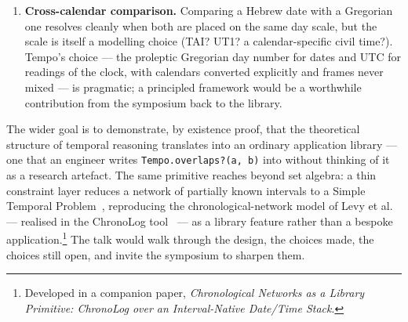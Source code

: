 \begin{enumerate}
  \item \textbf{Cross-calendar comparison.} Comparing a Hebrew date
    with a Gregorian one resolves cleanly when both are placed on the
    same day scale, but the scale is itself a modelling choice (TAI?
    UT1? a calendar-specific civil time?). Tempo's choice --- the
    proleptic Gregorian day number for dates and UTC for readings of
    the clock, with calendars converted explicitly and frames never
    mixed --- is pragmatic; a principled framework would be a
    worthwhile contribution from the symposium back to the library.
\end{enumerate}

The wider goal is to demonstrate, by existence proof, that the
theoretical structure of temporal reasoning translates into an
ordinary application library --- one that an engineer writes
\texttt{Tempo.overlaps?(a, b)} into without thinking of it as a
research artefact. The same primitive reaches beyond set algebra: a
thin constraint layer reduces a network of partially known intervals to
a Simple Temporal Problem~\cite{dechter1991}, reproducing the
chronological-network model of Levy et al.~\cite{levy2020} --- realised
in the ChronoLog tool~\cite{chronolog} --- as a library feature rather
than a bespoke application.\footnote{Developed in a companion paper,
  \emph{Chronological Networks as a Library Primitive: ChronoLog over an
  Interval-Native Date/Time Stack}.} The talk would walk through the
design, the choices made, the choices still open, and invite the
symposium to sharpen them.

